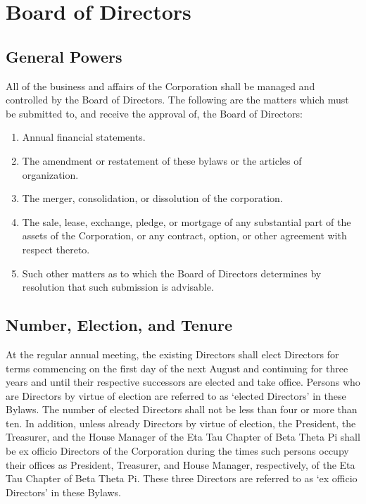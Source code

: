 \chapter{Board of Directors}

\section{General Powers}

All of the business and affairs of the Corporation shall be managed and
controlled by the Board of Directors.  The following are the matters which must
be submitted to, and receive the approval of, the Board of Directors:

\begin{enumerate}

    \item Annual financial statements.

    \item The amendment or restatement of these bylaws or the articles of
        organization.

    \item The merger, consolidation, or dissolution of the corporation.

    \item The sale, lease, exchange, pledge, or mortgage of any substantial
        part of the assets of the Corporation, or any contract, option,
        or other agreement with respect thereto.

    \item Such other matters as to which the Board of Directors determines by
    resolution that such submission is advisable.

\end{enumerate}

\section{Number, Election, and Tenure}

At the regular annual meeting, the existing Directors shall elect Directors for
terms commencing on the first day of the next August and continuing for three
years and until their respective successors are elected and take office. Persons
who are Directors by virtue of election are referred to as `elected Directors'
in these Bylaws. The number of elected Directors shall not be less than four or
more than ten. In addition, unless already Directors by virtue of election, the
President, the Treasurer, and the House Manager of the Eta Tau Chapter of Beta
Theta Pi shall be ex officio Directors of the Corporation during the times such
persons occupy their offices as President, Treasurer, and House Manager,
respectively, of the Eta Tau Chapter of Beta Theta Pi. These three Directors are
referred to as `ex officio Directors' in these Bylaws.

